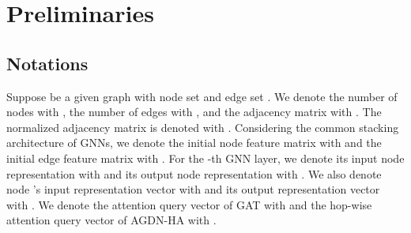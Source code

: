 \documentclass{article}
\begin{document}
\section{Preliminaries}
\subsection{Notations}
Suppose  be a given graph with node set  and edge set . We denote the number of nodes with , the number of edges with , and the adjacency matrix with . The normalized adjacency matrix is denoted with .
Considering the common stacking architecture of GNNs, we denote the initial node feature matrix with  and the initial edge feature matrix with . For the -th GNN layer, we denote its input node representation with  and its output node representation with . We also denote node 's input representation vector with  and its output representation vector with . We denote the attention query vector of GAT with  and the hop-wise attention query vector of AGDN-HA with .


\begin{table}[!hbt]
\small
\caption{Symbol definitions.}\label{tab: symbol definitions}
\begin{center}
\end{center}
    
\end{table}
\end{document}
